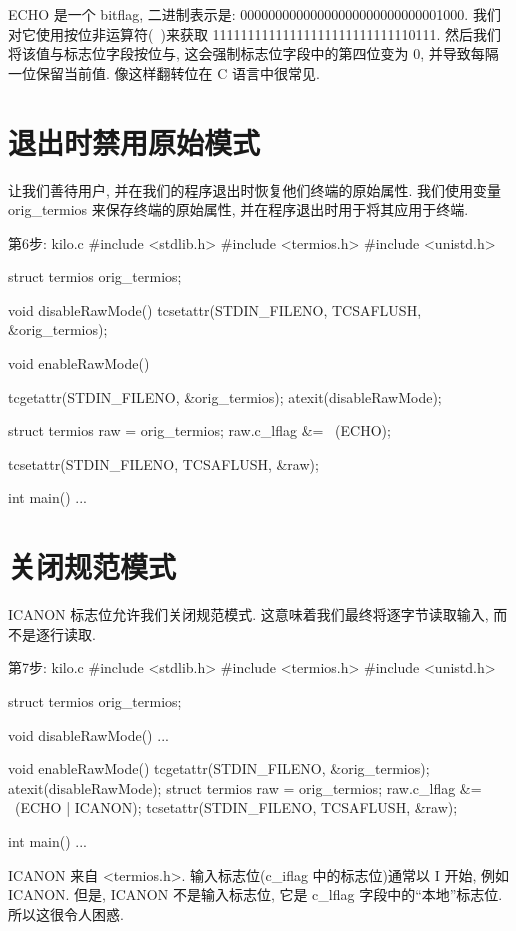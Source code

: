 \documentclass[lang=cn,newtx,10pt,scheme=chinese]{elegantbook}
\begin{document}
ECHO 是一个 bitflag, 二进制表示是: 00000000000000000000000000001000. 我们对它使用按位非运算符(~)来获取 11111111111111111111111111110111. 然后我们将该值与标志位字段按位与, 这会强制标志位字段中的第四位变为 0, 并导致每隔一位保留当前值. 像这样翻转位在 C 语言中很常见.

\section{退出时禁用原始模式}

让我们善待用户, 并在我们的程序退出时恢复他们终端的原始属性. 我们使用变量 orig\_termios 来保存终端的原始属性, 并在程序退出时用于将其应用于终端.

\begin{mycode}{第6步: kilo.c}
#include <stdlib.h>
#include <termios.h>
#include <unistd.h>

struct termios orig_termios;

void disableRawMode() {
  tcsetattr(STDIN_FILENO, TCSAFLUSH, &orig_termios);
}

void enableRawMode() {
  tcgetattr(STDIN_FILENO, &orig_termios);
  atexit(disableRawMode);

  struct termios raw = orig_termios;
  raw.c_lflag &= ~(ECHO);

  tcsetattr(STDIN_FILENO, TCSAFLUSH, &raw);
}

int main() { ... }
\end{mycode}

\section{关闭规范模式}

ICANON 标志位允许我们关闭规范模式. 这意味着我们最终将逐字节读取输入, 而不是逐行读取.

\begin{mycode}{第7步: kilo.c}
#include <stdlib.h>
#include <termios.h>
#include <unistd.h>

struct termios orig_termios;

void disableRawMode() { ... }

void enableRawMode() {
  tcgetattr(STDIN_FILENO, &orig_termios);
  atexit(disableRawMode);
  struct termios raw = orig_termios;
  raw.c_lflag &= ~(ECHO | ICANON);
  tcsetattr(STDIN_FILENO, TCSAFLUSH, &raw);
}

int main() { ... }
\end{mycode}

ICANON 来自 <termios.h>. 输入标志位(c\_iflag 中的标志位)通常以 I 开始, 例如 ICANON. 但是, ICANON 不是输入标志位, 它是 c\_lflag 字段中的``本地''标志位. 所以这很令人困惑.
\end{document}
